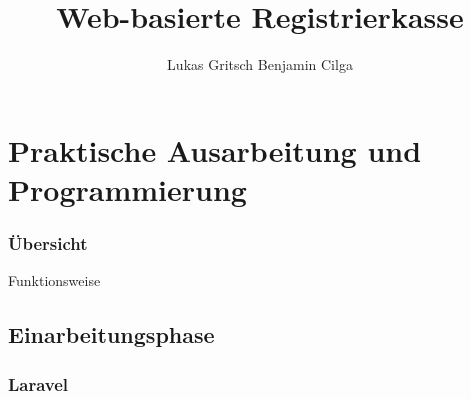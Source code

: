 \documentclass[12pt]{beamer}
\title{Web-basierte Registrierkasse}
\author{Lukas Gritsch Benjamin Cilga}
\begin{document}
\begin{frame}[plain]
\maketitle
\small
\end{frame}

\begin{frame}
	\tableofcontents
\end{frame}


\section{Praktische Ausarbeitung und Programmierung}

\begin{frame}
\frametitle{Übersicht}
\Large Funktionsweise
\begin{figure}[h]
	\centering
	 \hfill
	
\end{figure}
\end{frame}

\subsection{Einarbeitungsphase}

\subsubsection{Laravel}
\end{document}
